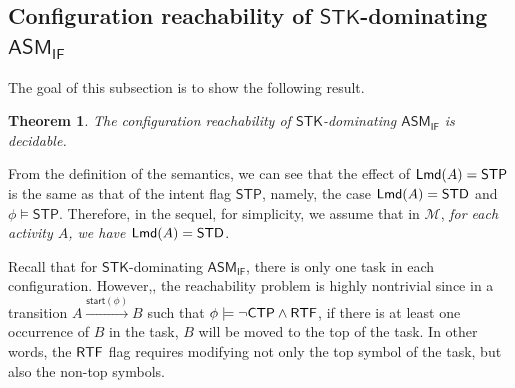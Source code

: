 \documentclass[preprint,12pt]{elsarticle}
\newtheorem{theorem}{Theorem}
\newcommand\Mm{{\mathcal{M} }}
\newcommand\act{{\sf Act}}
\newcommand\aft{{\sf Aft}}
\newcommand\lmd{{\sf Lmd}}
\newcommand\standard{{\sf STD}}
\newcommand\singletop{{\sf STP}}
\newcommand\ntkflag{{\sf NTK}}
\newcommand\ctpflag{{\sf CTP}}
\newcommand\stpflag{{\sf STP}}
\newcommand\ctkflag{{\sf CTK}}
\newcommand\rtfflag{{\sf RTF}}
\newcommand{\IFAMASS}{\textsf{ASM}_\textsf{IF}}
\newcommand\startactivity{{\mathsf{start} }}
\newcommand{\STK}{\mathsf{STK}}
\newcommand{\STP}{\mathsf{STP}}
\begin{document}




\subsection{Configuration reachability of $\STK$-dominating $\IFAMASS$}

The goal of this subsection is to show the following result. 

\begin{theorem}\label{thm-reach-ifamass}
The configuration reachability of $\STK$-dominating $\IFAMASS$ is decidable. 
\end{theorem}



From the definition of the semantics, we can see that the effect of $\lmd(A) = \singletop$ is the same as that of the intent flag $\STP$, namely, the case $\lmd(A) = \standard$ and $\phi \models \STP$. Therefore, in the sequel, for simplicity, we assume that in $\Mm$, \emph{for each activity $A$, we have $\lmd(A) = \standard$}. 


Recall that for  $\STK$-dominating $\IFAMASS$, there is only one task in each configuration. %
However,, the reachability problem %
is highly nontrivial since in a transition $A \xrightarrow{\startactivity(\phi)} B$ such that $\phi \models \neg \ctpflag \wedge \rtfflag$, if there is at least one occurrence of $B$ in the task, $B$ will be moved to the top of the task. In other words, the $\rtfflag$ flag requires modifying not only the top symbol of the task, but also the non-top symbols. 
\end{document}
